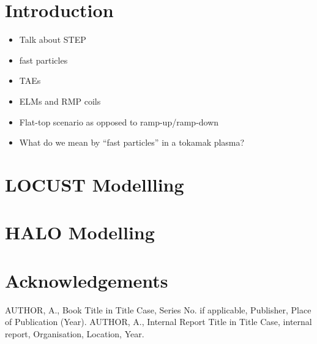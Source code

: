 \documentclass[10pt, a4paper, twoside]{article}
\begin{document}
\section{Introduction}

\begin{itemize}
    \item Talk about STEP
    \item fast particles
    \item TAEs
    \item ELMs and RMP coils
    \item Flat-top scenario as opposed to ramp-up/ramp-down
    \item What do we mean by “fast particles” in a tokamak plasma?
\end{itemize}



\section{LOCUST Modellling}
\lipsum[4-5]

\section{HALO Modelling}

\lipsum[6-7]

\section*{Acknowledgements}
\lipsum[10]

\fontsize{9}{12}\selectfont
\setlength{\parskip}{0pt}
\begin{thebibliography}{9}
  AUTHOR, A., 
  Book Title in Title Case, 
  Series No. if applicable, 
  Publisher, 
  Place of Publication (Year).
  AUTHOR, A., 
  Internal Report Title in Title Case, 
  internal report, 
  Organisation,
  Location,
  Year.
\end{thebibliography}
\end{document}
